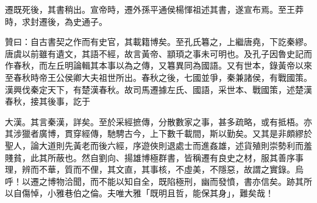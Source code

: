 \begin{pinyinscope}
遷既死後，其書稍出。宣帝時，遷外孫平通侯楊惲祖述其書，遂宣布焉。至王莽時，求封遷後，為史通子。

贊曰：自古書契之作而有史官，其載籍博矣。至孔氏篹之，上繼唐堯，下訖秦繆。唐虞以前雖有遺文，其語不經，故言黃帝、顓頊之事未可明也。及孔子因魯史記而作春秋，而左丘明論輯其本事以為之傳，又篹異同為國語。又有世本，錄黃帝以來至春秋時帝王公侯卿大夫祖世所出。春秋之後，七國並爭，秦兼諸侯，有戰國策。漢興伐秦定天下，有楚漢春秋。故司馬遷據左氏、國語，采世本、戰國策，述楚漢春秋，接其後事，訖于

大漢。其言秦漢，詳矣。至於采經摭傳，分散數家之事，甚多疏略，或有抵梧。亦其涉獵者廣博，貫穿經傳，馳騁古今，上下數千載間，斯以勤矣。又其是非頗繆於聖人，論大道則先黃老而後六經，序遊俠則退處士而進姦雄，述貨殖則崇勢利而羞賤貧，此其所蔽也。然自劉向、揚雄博極群書，皆稱遷有良史之材，服其善序事理，辨而不華，質而不俚，其文直，其事核，不虛美，不隱惡，故謂之實錄。烏呼！以遷之博物洽聞，而不能以知自全，既陷極刑，幽而發憤，書亦信矣。跡其所以自傷悼，小雅巷伯之倫。夫唯大雅「既明且哲，能保其身」，難矣哉！


\end{pinyinscope}